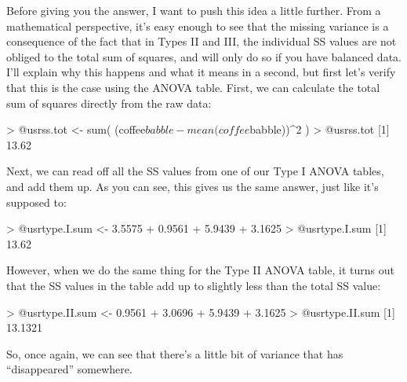Before giving you the answer, I want to push this idea a little further. From a mathematical perspective, it's easy enough to see that the missing variance is a consequence of the fact that in Types II and III, the individual SS values are not obliged to the total sum of squares, and will only do so if you have balanced data. I'll explain why this happens and what it means in a second, but first let's verify that this is the case using the ANOVA table. First, we can calculate the total sum of squares directly from the raw data:
\begin{rblock1}
> @usr{ss.tot <- sum( (coffee$babble - mean(coffee$babble))^2 )}
> @usr{ss.tot}
[1] 13.62
\end{rblock1}
Next, we can read off all the SS values from one of our Type I ANOVA tables, and add them up. As you can see, this gives us the same answer, just like it's supposed to:
\begin{rblock1}
> @usr{type.I.sum <- 3.5575 + 0.9561 + 5.9439 + 3.1625}
> @usr{type.I.sum}
[1] 13.62
\end{rblock1}
However, when we do the same thing for the Type II ANOVA table, it turns out that the SS values in the table add up to slightly less than the total SS value:
\begin{rblock1}
> @usr{type.II.sum <- 0.9561 + 3.0696 + 5.9439 + 3.1625}
> @usr{type.II.sum}
[1] 13.1321
\end{rblock1}
So, once again, we can see that there's a little bit of variance that has ``disappeared'' somewhere.

